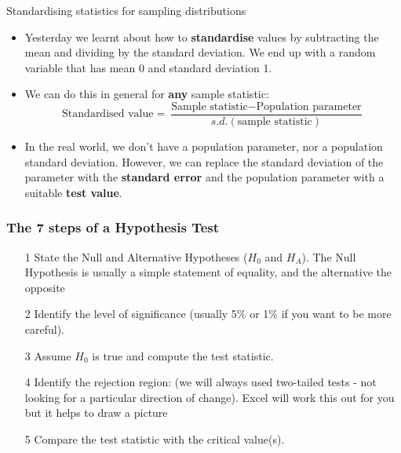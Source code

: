 \documentclass[12pt,xcolor=dvipsnames,handout,mathserif,aspectratio=169]{beamer}
\newcommand{\bbl}[1]{{\color{NavyBlue} \textbf{#1}}}
\newcommand{\bre}[1]{{\color{red} \textbf{#1}}}
\newcommand{\bgr}[1]{{\color{PineGreen} \textbf{#1}}}
\begin{document}
\begin{frame}{Standardising statistics for sampling distributions}

\begin{itemize}
\item Yesterday we learnt about how to \bgr{standardise} values by subtracting the mean and dividing by the standard deviation. We end up with a random variable that has mean 0 and standard deviation 1. 
\item We can do this in general for \bre{any} sample statistic: 
$$\mbox{Standardised value} = \frac{\mbox{Sample statistic}-\mbox{Population parameter}}{s.d.(\mbox{sample statistic})}$$
\item In the real world, we don't have a population parameter, nor a population standard deviation. However, we can replace the standard deviation of the parameter with the \bre{standard error} and the population parameter with a suitable \bbl{test value}.
\end{itemize}
\end{frame}

\begin{frame}\frametitle{The 7 steps of a Hypothesis Test}
\begin{enumerate}
\item[1] State the Null and Alternative Hypotheses ($H_0$ and $H_A$). The Null Hypothesis is usually a simple statement of equality, and the alternative the opposite
\vspace*{0.5cm}
\item[2] Identify the level of significance (usually 5\% or 1\% if you want to be more careful).
\vspace*{0.5cm}
\item[3] Assume $H_0$ is true and compute the test statistic. \pause
\vspace*{0.5cm}
\item[4] Identify the rejection region: (we will always used two-tailed tests - not looking for a particular direction of change). Excel will work this out for you but it helps to draw a picture
\vspace*{0.5cm}
\item[5] Compare the test statistic with the critical value(s). \pause
\end{enumerate}
\end{frame}
\end{document}

